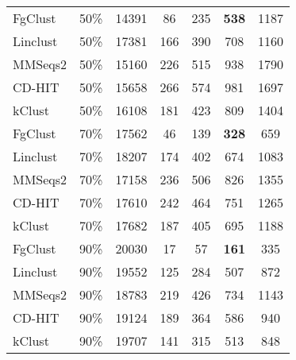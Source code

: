 \documentclass{bioinfo}
\begin{document}
\begin{table}
\begin{tabular}{l c c c c c c}
		FgClust   & 50\% & 14391 & 86 & 235 & {\bfseries 538} & 1187 \\
		Linclust  & 50\% & 17381 & 166 & 390 & 708 & 1160 \\ %
		MMSeqs2   & 50\% & 15160 & 226 & 515 & 938 & 1790 \\ %
		CD-HIT    & 50\% & 15658 & 266 & 574 & 981 & 1697 \\ %
		kClust    & 50\% & 16108 & 181 & 423 & 809 & 1404 \\ %
		\noalign{\vskip 2mm} 
		FgClust   & 70\% & 17562 &  46 & 139 & {\bfseries 328}  & 659 \\
		Linclust  & 70\% & 18207 & 174 & 402 & 674 & 1083 \\ %
		MMSeqs2   & 70\% & 17158 & 236 & 506 & 826 & 1355 \\ %
		CD-HIT    & 70\% & 17610 & 242 & 464 & 751 & 1265 \\ %
		kClust    & 70\% & 17682 & 187 & 405 & 695 & 1188 \\ %
		\noalign{\vskip 2mm} 
		FgClust   & 90\% & 20030 & 17  & 57  & {\bfseries 161}  & 335 \\
		Linclust  & 90\% & 19552 & 125 & 284 & 507 & 872  \\ %
		MMSeqs2   & 90\% & 18783 & 219 & 426 & 734 & 1143 \\ %
		CD-HIT    & 90\% & 19124 & 189 & 364 & 586 & 940  \\ %
		kClust    & 90\% & 19707 & 141 & 315 & 513 & 848  \\ %
		\bottomrule
	\end{tabular}
	\label{table:pdb}
\end{table}
\end{document}
